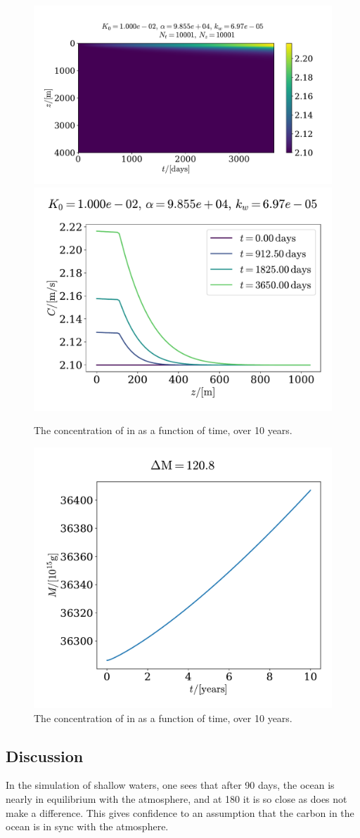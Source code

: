 \documentclass{article}
\begin{document}
    \begin{figure}
        \centering
        \includegraphics[width=.60\textwidth]{../plots/prob3}
        \includegraphics[width=.39\textwidth]{../plots/prob3_i}
        \caption{The concentration of  in as a function of time, over 10 years.}
        \label{prob3}
    \end{figure}

    \begin{figure}
        \centering
        \includegraphics[width=.60\textwidth]{../plots/prob3_M}
        \caption{The concentration of  in as a function of time, over 10 years.}
        \label{prob3 mass}
    \end{figure}

    \subsection*{Discussion}
    In the simulation of shallow waters, one sees that after 90 days, the ocean is nearly in equilibrium with the atmosphere, and at 180 it is so close as does not make a difference. This gives confidence to an assumption that the carbon in the ocean is in sync with the atmosphere.
\end{document}
